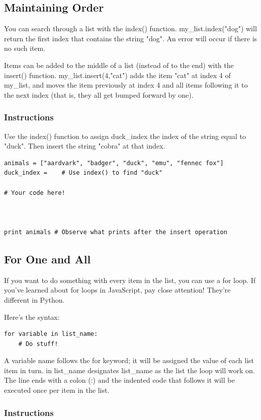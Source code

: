 \documentclass[12pt,a4paper,final,twoside,onecolumn,titlepage]{book}
\begin{document}
\subsection{Maintaining Order}

You can search through a list with the index() function. my\_list.index("dog") will return the first index that contains the string "dog". An error will occur if there is no such item.

Items can be added to the middle of a list (instead of to the end) with the insert() function. my\_list.insert(4,"cat") adds the item "cat" at index 4 of my\_list, and moves the item previously at index 4 and all items following it to the next index (that is, they all get bumped forward by one).
\subsubsection{Instructions}

Use the index() function to assign duck\_index the index of the string equal to "duck". Then insert the string "cobra" at that index.

\begin{lstlisting}
animals = ["aardvark", "badger", "duck", "emu", "fennec fox"]
duck_index =    # Use index() to find "duck"

# Your code here!



print animals # Observe what prints after the insert operation
\end{lstlisting}


\subsection{For One and All}

If you want to do something with every item in the list, you can use a for loop. If you've learned about for loops in JavaScript, pay close attention! They're different in Python.

Here's the syntax:
\begin{lstlisting}
for variable in list_name:
    # Do stuff!
\end{lstlisting}
A variable name follows the for keyword; it will be assigned the value of each list item in turn. in list\_name designates list\_name as the list the loop will work on. The line ends with a colon (:) and the indented code that follows it will be executed once per item in the list.
\subsubsection{Instructions}
\end{document}
